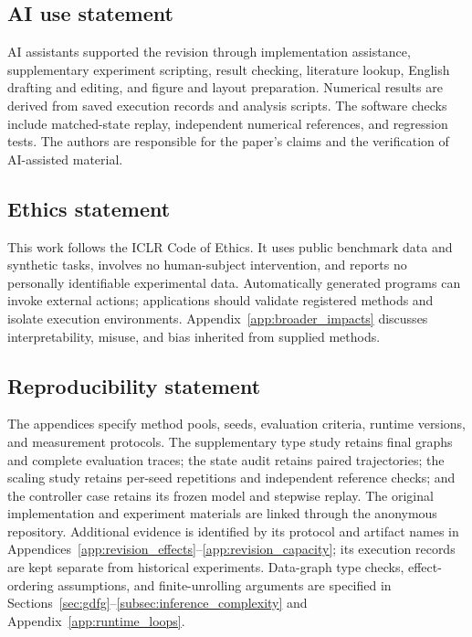 \subsection*{AI use statement}
AI assistants supported the revision through implementation assistance, supplementary experiment scripting, result checking, literature lookup, English drafting and editing, and figure and layout preparation. Numerical results are derived from saved execution records and analysis scripts. The software checks include matched-state replay, independent numerical references, and regression tests. The authors are responsible for the paper's claims and the verification of AI-assisted material.

\subsection*{Ethics statement}
This work follows the ICLR Code of Ethics. It uses public benchmark data and synthetic tasks, involves no human-subject intervention, and reports no personally identifiable experimental data. Automatically generated programs can invoke external actions; applications should validate registered methods and isolate execution environments. Appendix~\ref{app:broader_impacts} discusses interpretability, misuse, and bias inherited from supplied methods.

\subsection*{Reproducibility statement}
The appendices specify method pools, seeds, evaluation criteria, runtime versions, and measurement protocols. The supplementary type study retains final graphs and complete evaluation traces; the state audit retains paired trajectories; the scaling study retains per-seed repetitions and independent reference checks; and the controller case retains its frozen model and stepwise replay. The original implementation and experiment materials are linked through the anonymous repository. Additional evidence is identified by its protocol and artifact names in Appendices~\ref{app:revision_effects}--\ref{app:revision_capacity}; its execution records are kept separate from historical experiments. Data-graph type checks, effect-ordering assumptions, and finite-unrolling arguments are specified in Sections~\ref{sec:gdfg}--\ref{subsec:inference_complexity} and Appendix~\ref{app:runtime_loops}.
